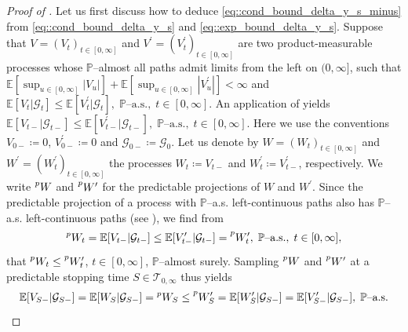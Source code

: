 \documentclass[10pt]{article} %
\newcommand\cG{\mathcal G}
\newcommand\cT{\mathcal T}
\def \E{\mathbb{E}}
\def \P{\mathbb{P}}
\newcommand{\1}{\mathbf{1}}
\begin{document}
\begin{proof}[Proof of ]
	Let us first discuss how to deduce \eqref{eq::cond_bound_delta_y_s_minus} from \eqref{eq::cond_bound_delta_y_s} and \eqref{eq::exp_bound_delta_y_s}. Suppose that $V = (V_t)_{t \in [0,\infty]}$ and $V^\prime = (V^\prime_t)_{t \in [0,\infty]}$ are two product-measurable processes whose $\P$--almost all paths admit limits from the left on $(0,\infty]$, such that $\E[\sup_{u \in [0,\infty]}|V_u|] + \E[\sup_{u \in [0,\infty]}|V^\prime_u|] < \infty$ and $\E[V_t |\cG_t] \leq \E[V^\prime_t |\cG_t], \; \text{$\P$--a.s.}, \; t \in [0,\infty]$. An application of  yields $\E[V_{t-}|\cG_{t-}] \leq \E[V^\prime_{t-}|\cG_{t-}], \; \text{$\P$--a.s.}, \; t \in [0,\infty]$. Here we use the conventions $V_{0-} \coloneqq 0$, $V^\prime_{0-} \coloneqq 0$ and $\cG_{0-} \coloneqq \cG_0$. Let us denote by $W = (W_t)_{t \in [0,\infty]}$ and $W^\prime = (W^\prime_t)_{t \in [0,\infty]}$ the processes $W_t \coloneqq V_{t-}$ and $W^\prime_t \coloneqq V^\prime_{t-}$, respectively. We write $\prescript{p}{}{W}$ and $\prescript{p}{}{W^\prime}$ for the predictable projections of $W$ and $W^\prime$. Since the predictable projection of a process with $\P$--a.s. left-continuous paths also has $\P$--a.s. left-continuous paths (see \cite[Theorem VI.47 and Remark VI.50.(f)]{dellacherie1982probabilities}), we find from
	\begin{equation*}
		\prescript{p}{}{W_t} = \E[V_{t-}|\cG_{t-}] \leq \E[V^\prime_{t-}|\cG_{t-}] = \prescript{p}{}{W^\prime_t}, \; \text{$\P$--a.s.}, \; t \in [0,\infty],
	\end{equation*}
	that $\prescript{p}{}{W_t} \leq \prescript{p}{}{W^\prime_t}$, $t \in [0,\infty]$, $\P$--almost surely. Sampling $\prescript{p}{}{W}$ and $\prescript{p}{}{W^\prime}$ at a predictable stopping time $S \in \cT_{0,\infty}$ thus yields
	\begin{equation*}
		\E[V_{S-}|\cG_{S-}] = \E[W_S|\cG_{S-}] = \prescript{p}{}{W_S} \leq \prescript{p}{}{W^\prime_S} = \E[W^\prime_S|\cG_{S-}] = \E[V^\prime_{S-}|\cG_{S-}], \; \text{$\P$--a.s.}
	\end{equation*}


\end{proof}
\end{document}
